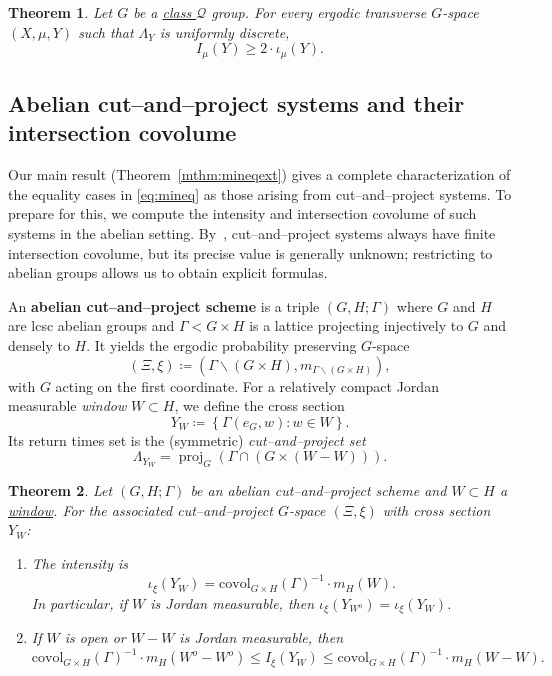 \documentclass{amsart}
\numberwithin{equation}{subsection}
\newtheorem{mainthm}{Theorem}
\theoremstyle{remark}
\begin{document}
\begin{mainthm}\label{mthm:mineq}
Let \(G\) be a \hyperlink{classQ}{class \(\mathcal{Q}\)} group. For every ergodic transverse \(G\)-space \(\left(X,\mu,Y\right)\) such that \(\Lambda_{Y}\) is uniformly discrete,
\begin{equation}\label{eq:mineq}
I_{\mu}\left(Y\right)\geq 2\cdot \iota_{\mu}\left(Y\right).
\end{equation}
\end{mainthm}

\subsection{Abelian cut--and--project systems and their intersection covolume}

Our main result (Theorem~\ref{mthm:mineqext}) gives a complete characterization of the equality cases in \eqref{eq:mineq} as those arising from cut--and--project systems. To prepare for this, we compute the intensity and intersection covolume of such systems in the abelian setting. By~\cite[Theorem~B]{AvBjCuI}, cut--and--project systems always have finite intersection covolume, but its precise value is generally unknown; restricting to abelian groups allows us to obtain explicit formulas.

An {\bf abelian cut--and--project scheme} is a triple \(\left(G,H;\Gamma\right)\) where \(G\) and \(H\) are lcsc abelian groups and \(\Gamma<G\times H\) is a lattice projecting injectively to \(G\) and densely to \(H\). It yields the ergodic probability preserving \(G\)-space 
\[\left(\Xi,\xi\right)\coloneqq\left(\Gamma\backslash\left(G\times H\right),m_{\Gamma\backslash\left(G\times H\right)}\right),\] 
with \(G\) acting on the first coordinate. For a relatively compact Jordan measurable {\em window} \(W\subset H\), we define the cross section 
\[Y_{W}\coloneqq\left\{\Gamma\left(e_{G},w\right):w\in W\right\}.\] 
Its return times set is the (symmetric) {\em cut--and--project set} 
\[\Lambda_{Y_{W}}=\operatorname{proj}_{G}\left(\Gamma\cap\left(G\times\left(W-W\right)\right)\right).\]

\begin{mainthm}\label{mthm:cap}
Let \(\left(G,H;\Gamma\right)\) be an abelian cut--and--project scheme and \(W\subset H\) a \hyperlink{window}{window}. For the associated cut--and--project \(G\)-space \(\left(\Xi,\xi\right)\) with cross section \(Y_{W}\):
\begin{enumerate}
    \item The intensity is 
    \[\iota_{\xi}\left(Y_{W}\right)=\mathrm{covol}_{G\times H}\left(\Gamma\right)^{-1}\cdot m_{H}\left(W\right).\] 
    In particular, if \(W\) is Jordan measurable, then \(\iota_{\xi}\left(Y_{W^{o}}\right)=\iota_{\xi}\left(Y_{W}\right)\).
    \item If \(W\) is open or \(W-W\) is Jordan measurable, then 
    \[\mathrm{covol}_{G\times H}\left(\Gamma\right)^{-1}\cdot m_{H}\left(W^{o}-W^{o}\right)\leq I_{\xi}\left(Y_{W}\right)\leq \mathrm{covol}_{G\times H}\left(\Gamma\right)^{-1}\cdot m_{H}\left(W-W\right).\]
\end{enumerate}
\end{mainthm}
\end{document}
